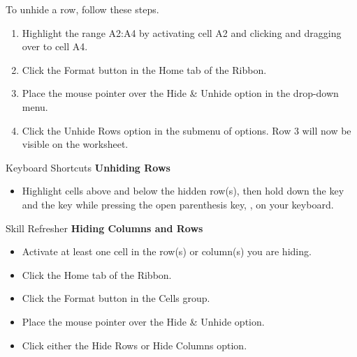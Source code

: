To unhide a row, follow these steps.

\begin{enumerate}
	\item Highlight the range \textsf{A2:A4} by activating cell \textsf{A2} and clicking and dragging over to cell \textsf{A4}.
	\item Click the Format button in the Home tab of the Ribbon.
	\item Place the mouse pointer over the Hide \& Unhide option in the drop-down menu.
	\item Click the Unhide Rows option in the submenu of options. Row 3 will now be visible on the worksheet.
\end{enumerate}

\begin{center}
	\begin{shtcutbox}{Keyboard Shortcuts}
		\textbf{Unhiding Rows}
		\\
		\begin{itemize}
			\setlength{\itemsep}{0pt}
			\setlength{\parskip}{0pt}
			\setlength{\parsep}{0pt}
			
			\item Highlight cells above and below the hidden row(s), then hold down the  key and the  key while pressing the open parenthesis key, \keystroke{(}, on your keyboard.
			
		\end{itemize}
	\end{shtcutbox}
\end{center}

\begin{center}
	\begin{sklbox}{Skill Refresher}
		\textbf{Hiding Columns and Rows}
		\\
		\begin{itemize}
			\setlength{\itemsep}{0pt}
			\setlength{\parskip}{0pt}
			\setlength{\parsep}{0pt}
			
			\item Activate at least one cell in the row(s) or column(s) you are hiding.
			\item Click the Home tab of the Ribbon.
			\item Click the Format button in the Cells group.
			\item Place the mouse pointer over the Hide \& Unhide option.
			\item Click either the Hide Rows or Hide Columns option.
			
		\end{itemize}
	\end{sklbox}
\end{center}


